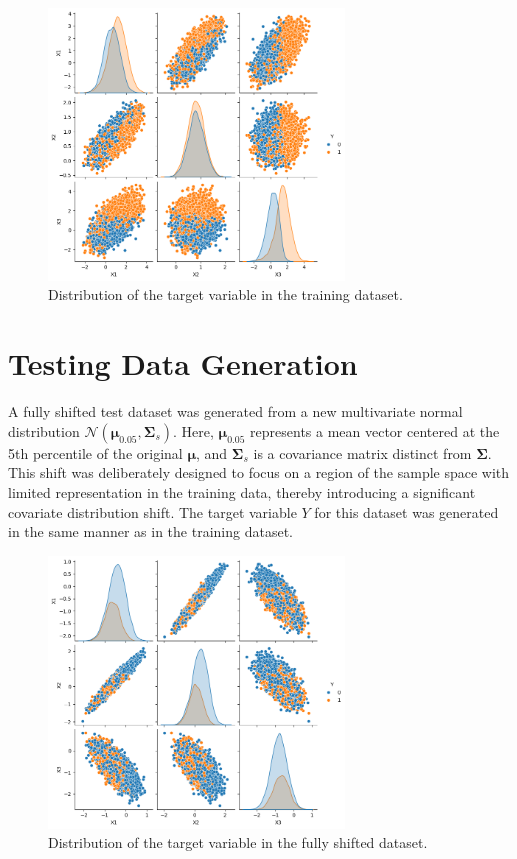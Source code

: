 \begin{figure}[H]
    \centering
    \includegraphics[width=0.7\textwidth]{assets/label_dist_train.png}
    \caption{Distribution of the target variable in the training dataset.}
    \label{fig:label_dist_train}
\end{figure}

\section{Testing Data Generation}
A fully shifted test dataset was generated from a new multivariate normal distribution $\mathcal{N}(\boldsymbol{\mu}_{0.05}, \boldsymbol{\Sigma}_s)$. Here, $\boldsymbol{\mu}_{0.05}$ represents a mean vector centered at the 5th percentile of the original $\boldsymbol{\mu}$, and $\boldsymbol{\Sigma}_s$ is a covariance matrix distinct from $\boldsymbol{\Sigma}$. This shift was deliberately designed to focus on a region of the sample space with limited representation in the training data, thereby introducing a significant covariate distribution shift. The target variable $Y$ for this dataset was generated in the same manner as in the training dataset.

\begin{figure}[H]
    \centering
    \includegraphics[width=0.7\textwidth]{assets/label_dist_fullyshift.png}
    \caption{Distribution of the target variable in the fully shifted dataset.}
    \label{fig:label_dist_fullyshift}
\end{figure}

